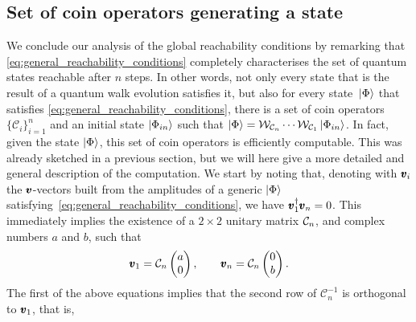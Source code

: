 \subsection{Set of coin operators generating a state}
\label{sec:coin_operators_generating_state}
We conclude our analysis of the global reachability conditions by remarking that \cref{eq:general_reachability_conditions} completely characterises the set of quantum states reachable after $n$ steps.
In other words, not only every state that is the result of a quantum walk evolution satisfies it, but also for every state $\ket*{\Phi}$ that satisfies \cref{eq:general_reachability_conditions}, there is a set of coin operators $\{ \mathcal C_i \}_{i=1}^n$ and an initial state $\ket{\Phi_{in}}$ such that
$\ket\Phi = 
	\mathcal W_{\mathcal C_n} \cdots \mathcal W_{\mathcal C_1}
	\ket{\Phi_{in}}$.
In fact, given the state $\ket\Phi$, this set of coin operators is efficiently computable.
This was already sketched in a previous section, but we will here give a more detailed and general description of the computation.
We start by noting that,
denoting with $\pmb{v}_i$ the $\pmb{v}$-vectors built from the amplitudes of a generic $\ket{\Phi}$ satisfying~\cref{eq:general_reachability_conditions}, we have $\pmb{v}_1^\dagger \pmb{v}_n = 0$.
This immediately implies the existence of a $2\times2$ unitary matrix $\mathcal{C}_n$, and complex numbers $a$ and $b$, such that
\begin{equation}
	\pmb{v}_1 = \mathcal C_n
	\begin{pmatrix} a \\ 0 \end{pmatrix},
	\qquad
	\pmb{v}_n = \mathcal C_n
	\begin{pmatrix} 0 \\ b \end{pmatrix}.
	\label{eq:equations_giving_C}
\end{equation}
The first of the above equations implies that the second row of $\mathcal C_n^{-1}$ is orthogonal to $\pmb{v}_1$, that is,
